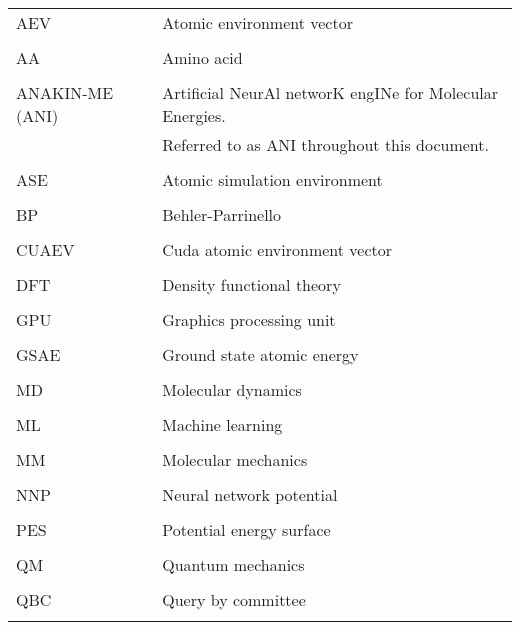 \singlespacing
\begin{tabular}{l p{5in}} 
AEV & Atomic environment vector\\
\\
AA & Amino acid \\
\\
ANAKIN-ME (ANI) & Artificial NeurAl networK engINe for Molecular Energies.\\
 & Referred to as ANI throughout this document.\\
\\
ASE & Atomic simulation environment\\
\\
BP & Behler-Parrinello\\
\\
CUAEV & Cuda atomic environment vector\\
\\
DFT & Density functional theory\\
\\
GPU & Graphics processing unit\\
\\
GSAE & Ground state atomic energy\\
\\
MD & Molecular dynamics\\
\\
ML & Machine learning\\
\\
MM & Molecular mechanics\\
\\
NNP & Neural network potential\\
\\
PES & Potential energy surface\\
\\
QM & Quantum mechanics\\
\\
QBC & Query by committee\\
\\


\end{tabular}
\doublespacing
